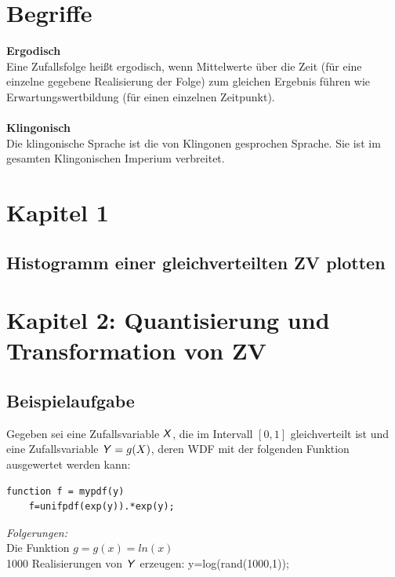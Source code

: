 \documentclass[deutsch]{latex4ei/latex4ei_sheet}
\begin{document}
\section{Begriffe}
\begin{sectionbox}
	\textbf{Ergodisch}\\
	Eine Zufallsfolge heißt ergodisch, wenn Mittelwerte über die Zeit (für
	eine einzelne gegebene Realisierung der Folge) zum gleichen Ergebnis führen wie
	Erwartungswertbildung (für einen einzelnen Zeitpunkt).\\\\
	\textbf{Klingonisch}\\
	Die klingonische Sprache ist die von Klingonen gesprochen Sprache. Sie ist im gesamten Klingonischen Imperium verbreitet.
	
\end{sectionbox}


\section{Kapitel 1}
\begin{sectionbox}
	\subsection{Histogramm einer gleichverteilten ZV plotten}
	
\end{sectionbox}


\section{Kapitel 2: Quantisierung und Transformation von ZV}
\begin{sectionbox}
	\subsection{Beispielaufgabe}
	Gegeben sei eine Zufallsvariable $\operatorname{\textsf{\textit{X}}}$, die im Intervall $[0, 1]$ gleichverteilt ist und eine Zufallsvariable $\operatorname{\textsf{\textit{Y}}}=g(X)$, deren WDF mit der folgenden Funktion ausgewertet werden kann:
	\begin{lstlisting}[gobble=4]
	function f = mypdf(y)
	f=unifpdf(exp(y)).*exp(y);	
	\end{lstlisting}
	\emph{Folgerungen:}\\
	Die Funktion $g=g(x)=ln(x)$\\
	1000 Realisierungen von $\operatorname{\textsf{\textit{Y}}}$ erzeugen: y=log(rand(1000,1));\\
\end{sectionbox}
\end{document}
